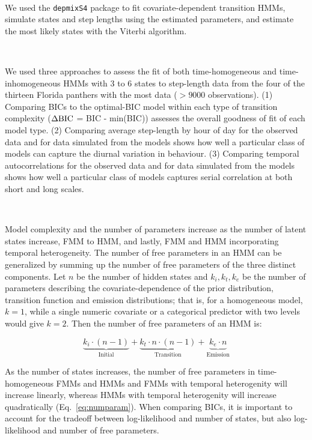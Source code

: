 \documentclass{bmcart}
\begin{document}
\

We used the {\tt depmixS4} package
to fit covariate-dependent transition HMMs, 
simulate states and step lengths using the
estimated parameters, and estimate the most likely
states with the Viterbi
algorithm.

\

\newcommand{\dbic}{\ensuremath \Delta \textrm{BIC}}

We used three approaches to assess the fit of both time-homogeneous and time-inhomogeneous 
HMMs with 3 to 6 states to step-length data from the four of the thirteen Florida panthers 
with the most data ($> 9000 $ observations). (1) Comparing BICs to the optimal-BIC model 
within each type of transition complexity ($\dbic$ = BIC - min(BIC)) assesses the overall 
goodness of fit of each model type. (2) Comparing average step-length by hour of day for the 
observed data and for data simulated from the models shows how well a particular class of 
models can capture the diurnal variation in behaviour. (3) Comparing temporal autocorrelations
for the observed data and for data simulated from the models shows how well a particular class
of models captures serial correlation at both short and long scales.

\

Model complexity and the number of parameters increase as the number of latent states increase, FMM to HMM, and lastly, FMM and HMM incorporating temporal heterogeneity. The number of free parameters in an HMM can be generalized by summing up the number of free parameters of the three distinct components. Let $n$ be the number of hidden states and $k_{i}, k_{t}, k_{e}$ be the number of parameters describing the covariate-dependence of the prior distribution, transition function and emission distributions; that is, for a homogeneous model, $k=1$, while a single numeric covariate or a categorical predictor with two levels would give $k=2$. Then the number of free parameters of an HMM is:

\begin{equation}
\underbrace{k_{i}\cdot (n-1)}_{\text{Initial}} 
{+} \underbrace{k_{t}\cdot n\cdot (n-1)}_{\text{Transition}}
{+} \underbrace{ k_{e}\cdot n}_{\text{Emission}}
\label{eq:numparam}
\end{equation}

As the number of states increases, the number of free parameters in time-homogeneous FMMs and HMMs and FMMs with temporal heterogenity will increase linearly, whereas HMMs with temporal heterogenity will increase quadratically (Eq.~\ref{eq:numparam}). When comparing BICs, it is important to account for the tradeoff between log-likelihood and number of states, but also log-likelihood and number of free parameters.
\end{document}

